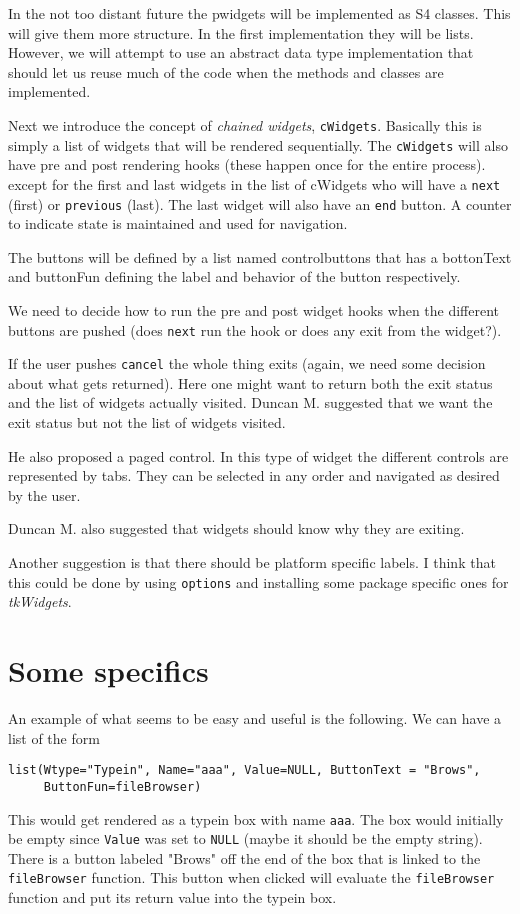\documentclass{article}
\begin{document}
In the not too distant future the pwidgets will be implemented as S4
classes. This will give them more structure. In the first
implementation they will be lists. However, we will attempt to use an
abstract data type implementation that should let us reuse much of the
code when the methods and classes are implemented.

Next we introduce the concept of {\em chained widgets},
\verb+cWidgets+. Basically this is simply a list of widgets that will
be rendered sequentially. The \verb+cWidgets+ will also have pre and
post rendering hooks (these happen once for the entire
process). except for the first and last widgets in the list of
cWidgets who will have a \verb+next+ (first) or \verb+previous+
(last). The last widget will also have an \verb+end+ button. A counter
to indicate state is maintained and used for navigation.  

The buttons will be defined by a list named controlbuttons that has a
bottonText and buttonFun defining the label and behavior of the button
respectively.  

We need to decide how to run the pre and post widget hooks when the
different buttons are pushed (does \verb+next+ run the hook or does
any exit from the widget?).

If the user pushes \verb+cancel+ the whole thing exits (again, we need
some decision about what gets returned). Here one might want to return
both the exit status and the list of widgets actually visited.
Duncan M. suggested that we want the exit status but not the list of
widgets visited.

He also proposed a paged control. In this type of widget the different
controls are represented by tabs. They can be selected in any order
and navigated as desired by the user.

Duncan M. also suggested that widgets should know why they are
exiting.

Another suggestion is that there should be platform specific labels.
I think that this could be done by using \verb+options+ and installing
some package specific ones for {\em tkWidgets}.

\section*{Some specifics}

An example of what seems to be easy and useful is the following.
We can have a list of the form
\begin{verbatim}
list(Wtype="Typein", Name="aaa", Value=NULL, ButtonText = "Brows",
     ButtonFun=fileBrowser) 
\end{verbatim}
This would get rendered as a typein box with name \verb+aaa+. The box
would initially be empty since \verb+Value+ was set to \verb+NULL+
(maybe it should be the empty string). There is a button labeled
"Brows" off the end of the box that is linked to the
\verb+fileBrowser+ function. This button when clicked will evaluate
the \verb+fileBrowser+ function and put its return value into the
typein box. 
\end{document}
